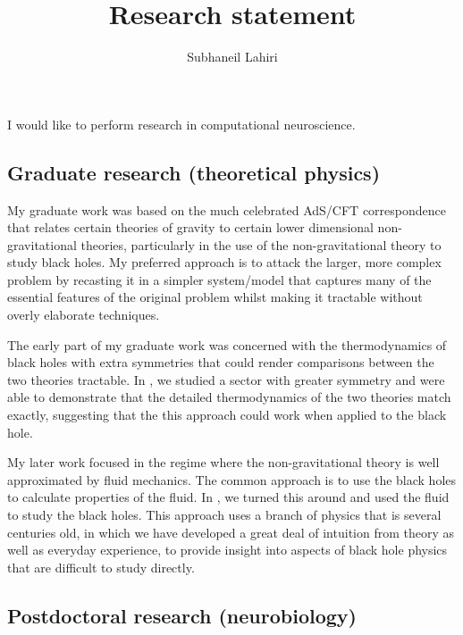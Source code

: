 \documentclass[12pt]{article}
\title{Research statement}
\author{Subhaneil Lahiri}
\begin{document}
\maketitle







I would like to perform research in computational neuroscience.

\subsection*{Graduate research (theoretical physics)}

My graduate work was based on the much celebrated AdS/CFT correspondence that relates certain theories of gravity to certain lower dimensional non-gravitational theories, particularly in the use of the non-gravitational theory to study black holes. My preferred approach is to attack the larger, more complex problem by recasting it in a simpler system/model that captures many of the essential features of the original problem whilst making it tractable without overly elaborate techniques.

The early part of my graduate work was concerned with the thermodynamics of black holes with extra symmetries that could render comparisons between the two theories tractable. In \cite{Biswas:2006tj}, we studied a sector with greater symmetry and were able to demonstrate that the detailed thermodynamics of the two theories match exactly, suggesting that the this approach could work when applied to the black hole.

My later work focused in the regime where the non-gravitational theory is well approximated by fluid mechanics. The common approach is to use the black holes to calculate properties of the fluid. In \cite{Lahiri:2007ae,Bhattacharyya:2007vs,Bhattacharya:2009gm}, we turned this around and used the fluid to study the black holes. This approach uses a branch of physics that is several centuries old, in which we have developed a great deal of intuition from theory as well as everyday experience, to provide insight into aspects of black hole physics that are difficult to study directly.


\subsection*{Postdoctoral research (neurobiology)}
\end{document}
